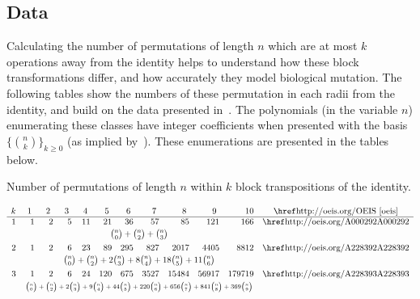   \subsection{Data}
  
    Calculating the number of permutations of length $n$ which are at most $k$ operations
    away from the identity helps to understand how these block transformations
    differ, and how accurately they model biological mutation. The following
    tables show the numbers of these permutation in each radii from the
    identity, and build on the data presented in~\cite{GenomeBook}. The
    polynomials (in the variable $n$) enumerating these classes have integer
    coefficients when presented with the basis $\{\binom{n}{k}\}_{k \geq 0}$
    (as implied by~\cite{Klazar2003}). These enumerations are presented in the
    tables below. 
  

    \begin{table}[t]
    \caption{Number of permutations of length $n$ within $k$ block transpositions of the
              identity.}
    \begin{footnotesize}
    $$
    \begin{array}{rrrrrrrrrrrc} 
    k &\ 1\ &\ 2\ &\ 3\ &\ 4\ &\ 5\ &\
    6\ &\ 7\ &\ 8\ &\ 9\ &10&\text{\OEISref}\\\hline
    1&1&2&5&11&21&36&57&85&121&166&\text{\OEISlink{A000292}}\\[0.5ex]
    &\multicolumn{10}{c}{{n\choose 0}+{n\choose 2}+{n\choose 3}}&\\[1ex]
    2&1&2&6&23&89&295&827&2017&4405&8812&\text{\OEISlink{A228392}}\\[0.5ex]
    &\multicolumn{10}{c}{{n\choose 0}+{n\choose 2}+2{n\choose 3}+8{n\choose
    4}+18{n\choose 5}+11{n\choose 6}}&\\[1ex]
    3&1&2&6&24&120&675&3527&15484&56917&179719&\text{\OEISlink{A228393}}\\[0.5ex]
    &\multicolumn{10}{c}{\text{\scriptsize $\nc0 + \nc2 + 2\nc3 + 9\nc4 +
    44\nc5 + 220\nc6 + 656\nc7 + 841\nc8 + 369\nc9$} }&\\[1ex]
    \end{array}
    $$
    \end{footnotesize}
    \end{table}

